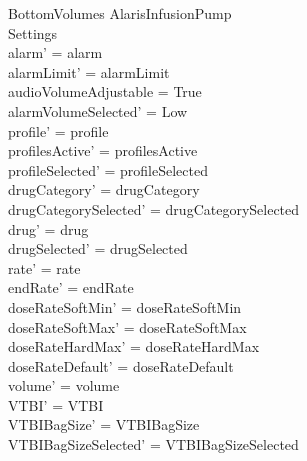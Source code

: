 \begin{schema}{BottomVolumes}
	\Delta AlarisInfusionPump\\
	 Settings\\
	\where
	alarm' = alarm\\
	alarmLimit' = alarmLimit\\
	audioVolumeAdjustable = True\\
	alarmVolumeSelected' = Low\\
	profile' = profile\\
	profilesActive' = profilesActive\\  
	  profileSelected' = profileSelected\\
	drugCategory' = drugCategory\\ drugCategorySelected' = drugCategorySelected\\
	drug' = drug\\ drugSelected' = drugSelected\\
	rate' = rate\\
	endRate' = endRate\\
	doseRateSoftMin' = doseRateSoftMin\\
	doseRateSoftMax' = doseRateSoftMax\\
	doseRateHardMax' = doseRateHardMax\\
	doseRateDefault' = doseRateDefault\\
	volume' = volume\\
	VTBI' = VTBI\\
	VTBIBagSize' = VTBIBagSize\\ 
	\pagebreak 
	VTBIBagSizeSelected' = VTBIBagSizeSelected\\

\end{schema}
